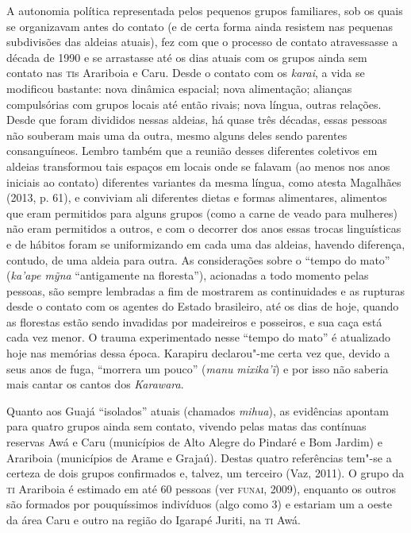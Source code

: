A autonomia política representada pelos pequenos grupos familiares, sob
os quais se organizavam antes do contato (e de certa forma ainda
resistem nas pequenas subdivisões das aldeias atuais), fez com que o
processo de contato atravessasse a década de 1990 e se arrastasse até os
dias atuais com os grupos ainda sem contato nas \textsc{ti}s Arariboia e Caru.
Desde o contato com os \emph{karai}, a vida se modificou bastante: nova
dinâmica espacial; nova alimentação; alianças compulsórias com grupos
locais até então rivais; nova língua, outras relações. Desde que foram
divididos nessas aldeias, há quase três décadas, essas pessoas não
souberam mais uma da outra, mesmo alguns deles sendo parentes
consanguíneos. Lembro também que a reunião desses diferentes coletivos
em aldeias transformou tais espaços em locais onde se falavam (ao menos
nos anos iniciais ao contato) diferentes variantes da mesma língua, como
atesta Magalhães (2013, p. 61), e conviviam ali diferentes dietas e
formas alimentares, alimentos que eram permitidos para alguns grupos
(como a carne de veado para mulheres) não eram permitidos a outros, e
com o decorrer dos anos essas trocas linguísticas e de hábitos foram se
uniformizando em cada uma das aldeias, havendo diferença, contudo, de
uma aldeia para outra. As considerações sobre o ``tempo do mato''
(\emph{ka'ape mỹna} ``antigamente na floresta''), acionadas a todo
momento pelas pessoas, são sempre lembradas a fim de mostrarem as
continuidades e as rupturas desde o contato com os agentes do Estado
brasileiro, até os dias de hoje, quando as florestas estão sendo
invadidas por madeireiros e posseiros, e sua caça está cada vez menor. O
trauma experimentado nesse ``tempo do mato'' é atualizado hoje nas
memórias dessa época. Karapiru declarou"-me certa vez que, devido a seus
anos de fuga, ``morrera um pouco'' (\emph{manu} \emph{mixika'ĩ}) e por
isso não saberia mais cantar os cantos dos \emph{Karawara}.

Quanto aos Guajá ``isolados'' atuais (chamados \emph{mihua}), as
evidências apontam para quatro grupos ainda sem contato, vivendo pelas
matas das contínuas reservas Awá e Caru (municípios de Alto Alegre do
Pindaré e Bom Jardim) e Arariboia (municípios de Arame e Grajaú). Destas
quatro referências tem"-se a certeza de dois grupos confirmados e,
talvez, um terceiro (Vaz, 2011). O grupo da \textsc{ti} Arariboia é estimado em
até 60 pessoas (ver \textsc{funai}, 2009), enquanto os outros são formados por
pouquíssimos indivíduos (algo como 3) e estariam um a oeste da área Caru
e outro na região do Igarapé Juriti, na \textsc{ti} Awá.

